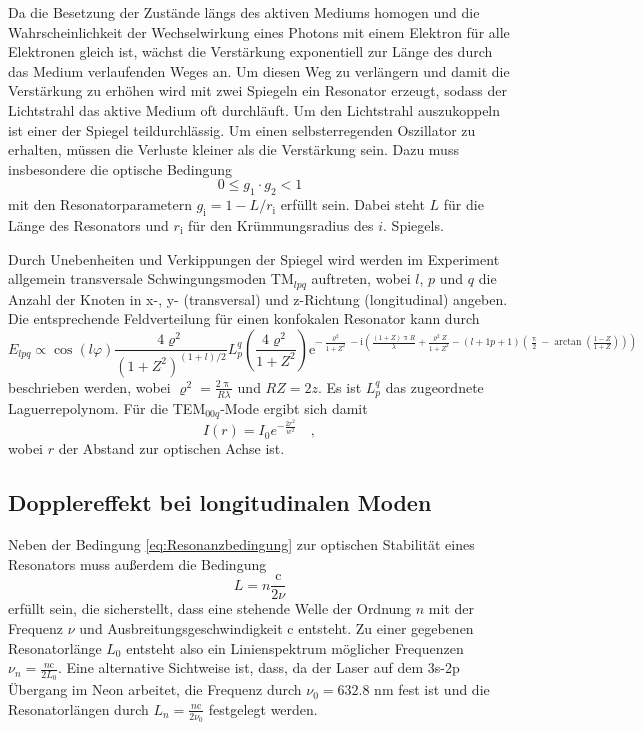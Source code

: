 Da die Besetzung der Zustände längs des aktiven Mediums homogen und die
Wahrscheinlichkeit der Wechselwirkung eines Photons mit einem Elektron für
alle Elektronen gleich ist, wächst die Verstärkung exponentiell zur Länge des
durch das Medium verlaufenden Weges an. Um diesen Weg zu verlängern und damit
die Verstärkung zu erhöhen wird mit zwei Spiegeln ein Resonator erzeugt,
sodass der Lichtstrahl das aktive Medium oft durchläuft. Um den Lichtstrahl
auszukoppeln ist einer der Spiegel teildurchlässig. Um einen selbsterregenden
Oszillator zu erhalten, müssen die Verluste kleiner als die Verstärkung sein.
Dazu muss insbesondere die optische Bedingung
\begin{equation}
0\leq g_1 \cdot g_2 <1 \label{eq:Resonanzbedingung}
\end{equation}
mit den Resonatorparametern $g_\text{i}=1-L/r_\text{i}$ erfüllt sein. Dabei
steht $L$ für die Länge des Resonators und $r_\text{i}$ für den
Krümmungsradius des $i$. Spiegels.

Durch Unebenheiten und Verkippungen der Spiegel wird werden im Experiment
allgemein transversale Schwingungsmoden TM$_{lpq}$ auftreten, wobei $l$, $p$
und $q$ die Anzahl der Knoten in x-, y- (transversal) und z-Richtung
(longitudinal) angeben. Die entsprechende Feldverteilung für einen konfokalen
Resonator kann durch
\begin{equation}
E_{lpq}\propto \cos(l\varphi)\frac{4\varrho^2}{(1+Z^2)^{(1+l)/2}}L_p^q\left(\frac{4\varrho^2}{1+Z^2}\right) \text{e}^{-\frac{\varrho^2}{1+Z^2}-\text{i}\left( \frac{(1+Z)\uppi R}{\lambda} +\frac{\varrho^2 Z}{1+Z^2}-(l+1p+1)\left(\frac{\uppi}{2}-\arctan\left( \frac{1-Z}{1+Z} \right) \right) \right)}  \label{eq:Feldverteilung}
\end{equation}
beschrieben werden, wobei $\varrho^2=\frac{2\uppi}{R\lambda}$ und $RZ=2z$. Es
ist $L_p^q$ das zugeordnete Laguerrepolynom.
Für die TEM$_{00q}$-Mode ergibt sich damit
\begin{equation}
I(r)=I_0 e^{-\frac{2r^2}{w^2}} \label{eq:TEM00} \quad ,
\end{equation}
wobei $r$ der Abstand zur optischen Achse ist.

\subsection{Dopplereffekt bei longitudinalen Moden}
Neben der Bedingung \eqref{eq:Resonanzbedingung} zur optischen Stabilität
eines Resonators muss außerdem die Bedingung
\begin{equation}
L=n\frac{\text{c}}{2 \nu}
\end{equation}
erfüllt sein, die sicherstellt, dass eine stehende Welle der Ordnung $n$ mit
der Frequenz $\nu$ und Ausbreitungsgeschwindigkeit c entsteht. Zu einer
gegebenen Resonatorlänge $L_0$ entsteht also ein Linienspektrum möglicher Frequenzen $\nu_n=\frac{n \text{c}}{2L_0}$. Eine alternative Sichtweise ist,  dass, da der Laser
auf dem 3s-2p Übergang im Neon arbeitet, die Frequenz durch $\nu_0=632.8 \text{ nm}$ fest ist und die Resonatorlängen durch $L_n=\frac{n\text{c}}{2\nu_0}$
festgelegt werden.

